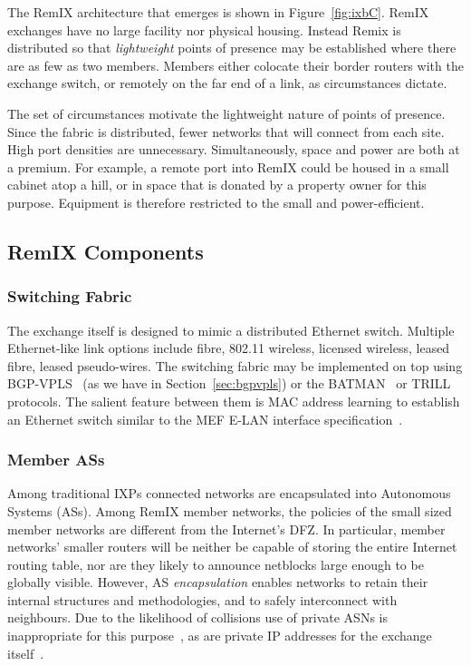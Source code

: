 The RemIX architecture that emerges is shown in Figure~\ref{fig:ixbC}. RemIX
exchanges have no large facility nor physical housing. Instead Remix is
distributed so that \emph{lightweight} points of presence may be established
where there are as few as two members. Members either colocate their border
routers with the exchange switch, or remotely on the far end of a link, as
circumstances dictate.

The set of circumstances motivate the lightweight nature of points of presence.
Since the fabric is distributed, fewer networks that will connect from each
site. High port densities are unnecessary. Simultaneously, space and power are
both at a premium. For example, a remote port into RemIX could be housed in a
small cabinet atop a hill, or in space that is donated by a property owner for
this purpose. Equipment is therefore restricted to the small and
power-efficient.


\subsection{RemIX Components}

\subsubsection{Switching Fabric}

The exchange itself is designed to mimic a distributed Ethernet switch. Multiple
Ethernet-like link options include fibre, 802.11 wireless, licensed wireless,
leased fibre, leased pseudo-wires. The switching fabric may be implemented on
top using BGP-VPLS~\cite{rfc4761} (as we have in
Section~\ref{sec:bgpvpls}) or the
\acs{BATMAN}~\cite{johnson2008simple} or
\acs{TRILL}~\cite{perlman2004rbridges} protocols. The salient feature
between them is MAC address learning to establish an Ethernet switch
similar to the \ac{MEF} E-LAN interface
specification~\cite{mef62,mefes}.

\subsubsection{Member \acp{AS}}

Among traditional \acp{IXP} connected networks are encapsulated into Autonomous
Systems (\acp{AS}). Among RemIX member networks, the policies of the small sized
member networks are
different from the Internet's \ac{DFZ}. In particular, member networks' smaller
routers will be neither be capable of storing the entire Internet routing table,
nor are they likely to announce netblocks large enough to be globally visible.
However, \ac{AS} \emph{encapsulation} enables networks to retain their internal
structures and methodologies, and to safely interconnect with neighbours. Due to
the likelihood of collisions use of private \acp{ASN} is inappropriate for this
purpose~\cite{rfc6996}, as are private IP addresses for the exchange
itself~\cite{rfc1918}.


